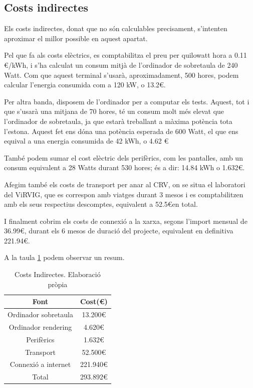 \documentclass[a4paper]{report}
\begin{document}
	\subsection{Costs indirectes} \label{section:cIndirectes}
	Els costs indirectes, donat que no són calculables precisament, s'intenten aproximar el millor possible en aquest apartat. \par
	Pel que fa als costs elèctrics, es comptabilitza el preu per quilowatt hora a 0.11 \euro/kWh, i s'ha calculat un consum mitjà de l'ordinador de sobretaula de 240 Watt. Com que aquest terminal s'usarà, aproximadament, 500 hores, podem calcular l'energia consumida com a 120 kW, o 13.2\euro. \par
	Per altra banda, disposem de l'ordinador per a computar els tests. Aquest, tot i que s'usarà una mitjana de 70 hores, té un consum molt més elevat que l'ordinador de sobretaula, ja que estarà treballant a màxima potència tota l'estona. Aquest fet ens dóna una potència esperada de 600 Watt, el que ens equival a una energia consumida de 42 kWh, o 4.62 \euro \par
	També podem sumar el cost elèctric dels perifèrics, com les pantalles, amb un consum equivalent a 28 Watts durant 530 hores; és a dir: 14.84 kWh o 1.632\euro. \par
	Afegim també els costs de transport per anar al CRV, on se situa el laboratori del ViRVIG, que es correspon amb viatges durant 3 mesos i es comptabilitzen amb els seus respectius descomptes, equivalent a 52.5\euro en total. \par
	I finalment cobrim els costs de connexió a la xarxa, segons l'import mensual de 36.99\euro, durant els 6 mesos de duració del projecte, equivalent en definitiva 221.94\euro.\par
	A la taula \ref{table:imprevistosI} podem observar un resum.
	\begin{table}
		\centering
		\begin{tabular}{||c|| c||}
			\hline
			\textbf{Font} & \textbf{Cost(\euro)} \\
			\hline \hline
			Ordinador sobretaula & 13.200\euro \\
			Ordinador rendering & 4.620\euro \\
			Perifèrics & 1.632\euro \\
			Transport & 52.500\euro \\
			Connexió a internet & 221.940\euro\\
			\hline \hline
			Total & 293.892\euro\\
			\hline
		\end{tabular}
		\caption[Costs Indirectes]{Costs Indirectes. Elaboració pròpia}
		\label{table:imprevistosI}
	\end{table}
	
\end{document}
